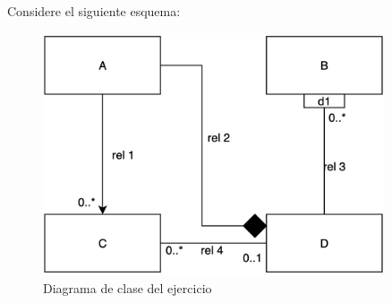  Considere el siguiente esquema:
\begin{figure}[h]
    \begin{center}
        \includegraphics[width=0.9\textwidth]{assets/Junio2013_1.png}
    \end{center}
    \caption{Diagrama de clase del ejercicio}
\end{figure}
